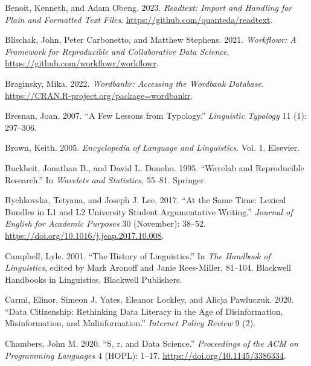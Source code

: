 \documentclass[
  letterpaper,
  DIV=11,
  numbers=noendperiod]{scrreport}
\newlength{\cslhangindent}
\newlength{\cslentryspacingunit} %
\newenvironment{CSLReferences}[2] %
 {%
  \setlength{\parindent}{0pt}
  \ifodd #1
  \let\oldpar\par
  \def\par{\hangindent=\cslhangindent\oldpar}
  \fi
  \setlength{\parskip}{#2\cslentryspacingunit}
 }%
 {}
\theoremstyle{definition}
\theoremstyle{remark}
\begin{document}
\begin{CSLReferences}{1}{0}
\leavevmode{}%
Benoit, Kenneth, and Adam Obeng. 2023. \emph{Readtext: Import and
Handling for Plain and Formatted Text Files}.
\url{https://github.com/quanteda/readtext}.

\leavevmode{}%
Blischak, John, Peter Carbonetto, and Matthew Stephens. 2021.
\emph{Workflowr: A Framework for Reproducible and Collaborative Data
Science}. \url{https://github.com/workflowr/workflowr}.

\leavevmode{}%
Braginsky, Mika. 2022. \emph{Wordbankr: Accessing the Wordbank
Database}. \url{https://CRAN.R-project.org/package=wordbankr}.

\leavevmode{}%
Bresnan, Joan. 2007. {``A Few Lessons from Typology.''} \emph{Linguistic
Typology} 11 (1): 297--306.

\leavevmode{}%
Brown, Keith. 2005. \emph{Encyclopedia of Language and Linguistics}.
Vol. 1. Elsevier.

\leavevmode{}%
Buckheit, Jonathan B., and David L. Donoho. 1995. {``Wavelab and
Reproducible Research.''} In \emph{Wavelets and Statistics}, 55--81.
Springer.

\leavevmode{}%
Bychkovska, Tetyana, and Joseph J. Lee. 2017. {``At the Same Time:
Lexical Bundles in L1 and L2 University Student Argumentative
Writing.''} \emph{Journal of English for Academic Purposes} 30
(November): 38--52. \url{https://doi.org/10.1016/j.jeap.2017.10.008}.

\leavevmode{}%
Campbell, Lyle. 2001. {``The History of Linguistics.''} In \emph{The
Handbook of Linguistics}, edited by Mark Aronoff and Janie Rees-Miller,
81--104. Blackwell Handbooks in Linguistics. Blackwell Publishers.

\leavevmode{}%
Carmi, Elinor, Simeon J. Yates, Eleanor Lockley, and Alicja Pawluczuk.
2020. {``Data Citizenship: Rethinking Data Literacy in the Age of
Disinformation, Misinformation, and Malinformation.''} \emph{Internet
Policy Review} 9 (2).

\leavevmode{}%
Chambers, John M. 2020. {``S, r, and Data Science.''} \emph{Proceedings
of the ACM on Programming Languages} 4 (HOPL): 1--17.
\url{https://doi.org/10.1145/3386334}.


\end{CSLReferences}
\end{document}
